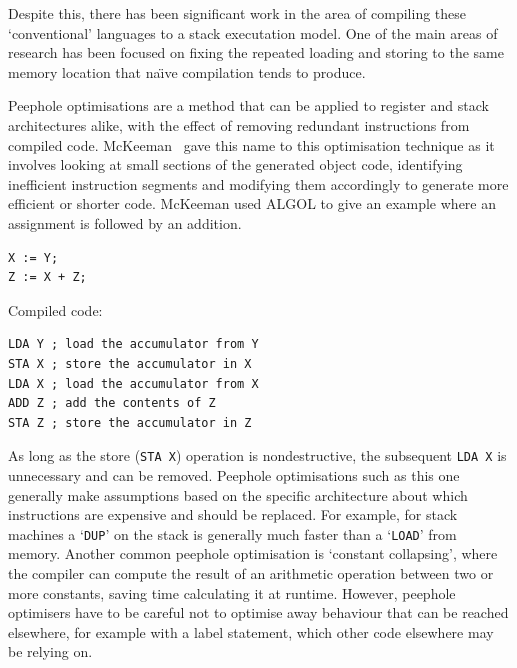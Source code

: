 Despite this, there has been significant work in the area of compiling these
`conventional' languages to a stack executation model. One of the main areas of
research has been focused on fixing the repeated loading and storing to the same
memory location that na{\"\i}ve compilation tends to produce.

Peephole optimisations are a method that can be applied to register and stack
architectures alike, with the effect of removing redundant instructions from
compiled code. McKeeman~\cite{McKeeman1965Peephole} gave this name to this
optimisation technique as it involves looking at small sections of the generated
object code, identifying inefficient instruction segments and modifying them
accordingly to generate more efficient or shorter code. McKeeman used ALGOL to
give an example where an assignment is followed by an addition.

\vspace{2ex}

\begin{minipage}{.25\textwidth}
  \centering
  \begin{lstlisting}[language=Algol]
X := Y;
Z := X + Z;
  \end{lstlisting}
\end{minipage}%
\begin{minipage}{.55\textwidth}
  Compiled code:
  \begin{lstlisting}
LDA Y ; load the accumulator from Y
STA X ; store the accumulator in X
LDA X ; load the accumulator from X
ADD Z ; add the contents of Z
STA Z ; store the accumulator in Z
  \end{lstlisting}
\end{minipage}

As long as the store (\lstinline{STA X}) operation is nondestructive, the
subsequent \lstinline{LDA X} is unnecessary and can be removed. Peephole
optimisations such as this one generally make assumptions based on the specific
architecture about which
instructions are expensive and should be replaced. For example, for
stack machines a `\texttt{DUP}' on the stack is generally much faster than a
`\texttt{LOAD}' from memory. Another common peephole optimisation is `constant
collapsing', where the compiler can compute the result of an arithmetic
operation between two or more constants, saving time calculating it at runtime.
However, peephole optimisers have to be careful not to optimise away behaviour
that can be reached elsewhere, for example with a label statement, which other
code elsewhere may be relying on.

